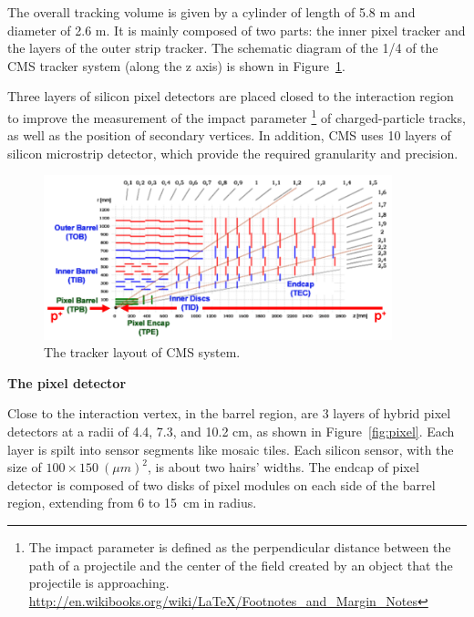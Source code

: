 The overall tracking volume is given by a cylinder of length of 5.8 m and diameter of 2.6 m. It is mainly
composed of two parts: the inner pixel tracker and the layers of the outer strip tracker. The schematic 
diagram of the 1/4 of the CMS tracker system (along the z axis) 
is shown in Figure~\ref{fig:trackerLayout}.     

Three layers of silicon pixel detectors are placed closed to the interaction region to improve the measurement of the impact parameter
\footnote{The impact parameter is defined as the perpendicular distance between the path of a projectile and the center of the field created by an object that the projectile is approaching. \url{http://en.wikibooks.org/wiki/LaTeX/Footnotes_and_Margin_Notes}} 
of charged-particle tracks, as well as the position of secondary vertices. 
In addition, CMS uses 10 layers of silicon microstrip detector, which provide the required granularity and precision.  

\begin{figure}
\centering
\includegraphics[width=0.9\textwidth]{figures/TrackerLayout.png}
\caption{The tracker layout of CMS system.}
\label{fig:trackerLayout}
\end{figure}

{\bf The pixel detector}

Close to the interaction vertex, in the barrel region, are 3 layers of hybrid pixel detectors at a radii of 4.4, 7.3, and 10.2 cm, as shown in Figure~\ref{fig:pixel}. 
Each layer is spilt into sensor segments like mosaic tiles. Each silicon sensor, with the size of $100 \times 150~(\mu m)^2$, is about two hairs' widths.
The endcap of pixel detector is composed of two disks of pixel modules on each side of the barrel region, extending from 6 to 15~cm in radius. 

